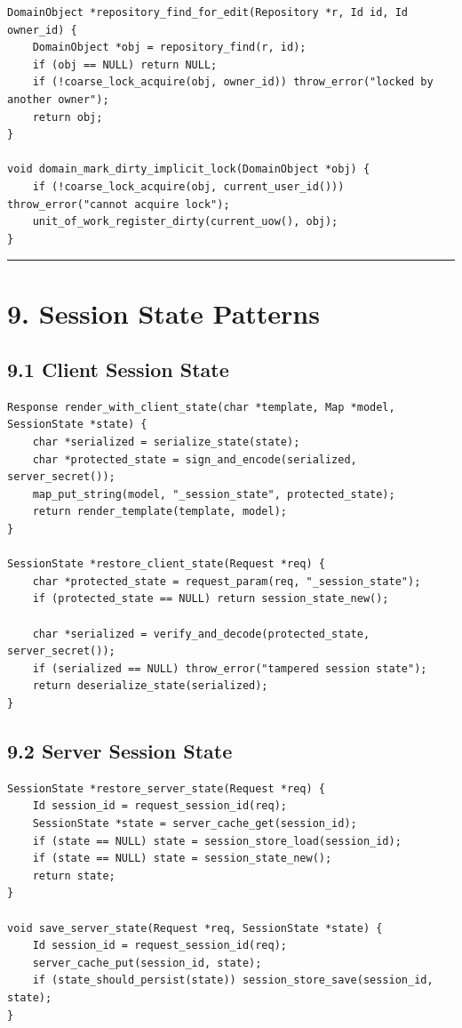 \documentclass[11pt]{article}
\begin{document}
\begin{verbatim}
DomainObject *repository_find_for_edit(Repository *r, Id id, Id owner_id) {
    DomainObject *obj = repository_find(r, id);
    if (obj == NULL) return NULL;
    if (!coarse_lock_acquire(obj, owner_id)) throw_error("locked by another owner");
    return obj;
}

void domain_mark_dirty_implicit_lock(DomainObject *obj) {
    if (!coarse_lock_acquire(obj, current_user_id())) throw_error("cannot acquire lock");
    unit_of_work_register_dirty(current_uow(), obj);
}
\end{verbatim}

\begin{center}\rule{0.5\linewidth}{0.5pt}\end{center}

\section{9. Session State Patterns}\label{session-state-patterns}

\subsection{9.1 Client Session State}\label{client-session-state}

\begin{verbatim}
Response render_with_client_state(char *template, Map *model, SessionState *state) {
    char *serialized = serialize_state(state);
    char *protected_state = sign_and_encode(serialized, server_secret());
    map_put_string(model, "_session_state", protected_state);
    return render_template(template, model);
}

SessionState *restore_client_state(Request *req) {
    char *protected_state = request_param(req, "_session_state");
    if (protected_state == NULL) return session_state_new();

    char *serialized = verify_and_decode(protected_state, server_secret());
    if (serialized == NULL) throw_error("tampered session state");
    return deserialize_state(serialized);
}
\end{verbatim}

\subsection{9.2 Server Session State}\label{server-session-state}

\begin{verbatim}
SessionState *restore_server_state(Request *req) {
    Id session_id = request_session_id(req);
    SessionState *state = server_cache_get(session_id);
    if (state == NULL) state = session_store_load(session_id);
    if (state == NULL) state = session_state_new();
    return state;
}

void save_server_state(Request *req, SessionState *state) {
    Id session_id = request_session_id(req);
    server_cache_put(session_id, state);
    if (state_should_persist(state)) session_store_save(session_id, state);
}
\end{verbatim}
\end{document}
